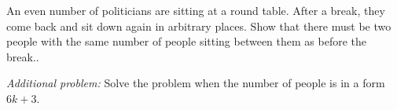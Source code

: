 An even number of politicians are sitting at a round table. After a break, they come back and sit down again in arbitrary places. Show that there must be two people with the same number of people sitting between them as before the break..

\textit{Additional problem:}
Solve the problem when the number of people is in a form $6k+3$.